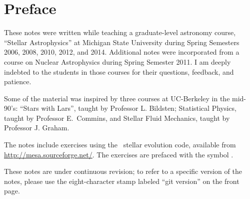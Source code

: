 
\section*{Preface}
These notes were written while teaching a graduate-level astronomy course, ``Stellar Astrophysics'' at Michigan State University during Spring Semesters 2006, 2008, 2010, 2012, and 2014.  Additional notes were incorporated from a course on Nuclear Astrophysics during Spring Semester 2011. I am deeply indebted to the students in those courses for their questions, feedback, and patience.

Some of the material was inspired by three courses at UC-Berkeley in the mid-90's: ``Stars with Lars'', taught by Professor L. Bildsten; Statistical Physics, taught by Professor E.~Commins, and Stellar Fluid Mechanics, taught by Professor J. Graham.

The notes include exercises using the \mesa\ stellar evolution code, available from \url{http://mesa.sourceforge.net/}.  The exercises are prefaced with the symbol .

These notes are under continuous revision; to refer to a specific version of the notes, please use the eight-character stamp labeled ``git version'' on the front page.
